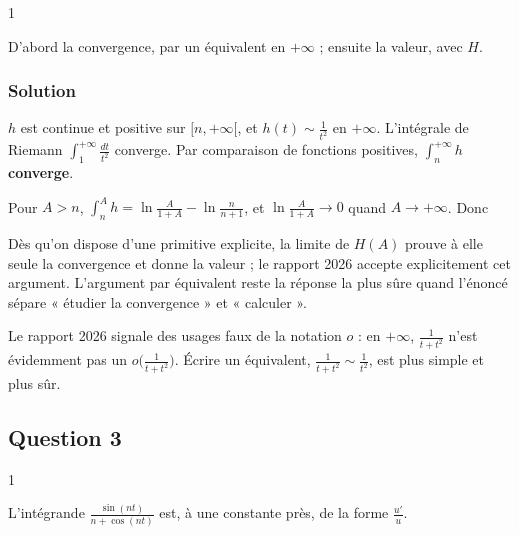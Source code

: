 \documentclass[11pt,a4paper]{article}
\newcommand{\equationajustee}[1]{%
  \sbox{\boiteequation}{$\displaystyle #1$}%
  \ifdim\wd\boiteequation>\linewidth
    \[\resizebox{\linewidth}{!}{\usebox{\boiteequation}}\]%
  \else
    \[#1\]%
  \fi}
\begin{document}
\begin{indication}{1}

D'abord la convergence, par un équivalent en \(+\infty\) ; ensuite la valeur, avec \(H\).

\end{indication}

\hypertarget{solution-10}{%
\subsubsection{Solution}\label{solution-10}}

\(h\) est continue et positive sur \([n,+\infty[\), et \(h(t)\sim\frac1{t^2}\) en \(+\infty\). L'intégrale de Riemann \(\int_1^{+\infty}\frac{dt}{t^2}\) converge. Par comparaison de fonctions positives, \(\int_n^{+\infty}h\) \textbf{converge}.

Pour \(A>n\), \(\int_n^Ah=\ln\frac{A}{1+A}-\ln\frac n{n+1}\), et \(\ln\frac{A}{1+A}\to0\) quand \(A\to+\infty\). Donc

\equationajustee{\boxed{\int_n^{+\infty}\frac{dt}{t+t^2}=\ln\frac{n+1}{n}}}

\begin{methode}

Dès qu'on dispose d'une primitive explicite, la limite de \(H(A)\) prouve à elle seule la convergence et donne la valeur ; le rapport 2026 accepte explicitement cet argument. L'argument par équivalent reste la réponse la plus sûre quand l'énoncé sépare « étudier la convergence » et « calculer ».

\end{methode}

\begin{piege}

Le rapport 2026 signale des usages faux de la notation \(o\) : en \(+\infty\), \(\frac1{t+t^2}\) n'est évidemment pas un \(o\big(\frac1{t+t^2}\big)\). Écrire un équivalent, \(\frac1{t+t^2}\sim\frac1{t^2}\), est plus simple et plus sûr.

\end{piege}

\hypertarget{question-3-1}{%
\subsection{Question 3}\label{question-3-1}}

\begin{indication}{1}

L'intégrande \(\frac{\sin(nt)}{n+\cos(nt)}\) est, à une constante près, de la forme \(\frac{u'}{u}\).

\end{indication}
\end{document}
